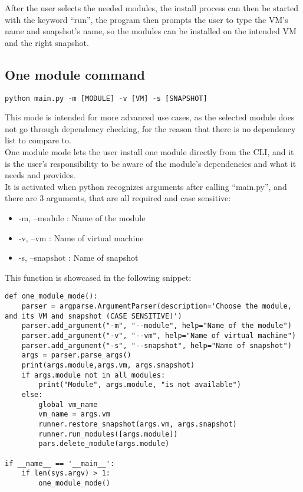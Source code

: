 After the user selects the needed modules, the install process can then be started with the keyword “run”, the program then prompts the user to type the VM’s name and snapshot’s name, so the modules can be installed on the intended VM and the right snapshot.\\

\subsection{One module command}
\begin{lstlisting}[caption=One module mode, style=pythonstyle]
python main.py -m [MODULE] -v [VM] -s [SNAPSHOT]
\end{lstlisting}

This mode is intended for more advanced use cases, as the selected module does not go through dependency checking, for the reason that there is no dependency list to compare to.\\
One module mode lets the user install one module directly from the CLI, and it is the user’s responsibility to be aware of the module’s dependencies and what it needs and provides.\\
It is activated when python recognizes arguments after calling “main.py”, and there are 3 arguments, that are all required and case sensitive:
\begin{itemize}
  \item -m, --module : Name of the module
  \item -v, --vm : Name of virtual machine
  \item -s, --snapshot : Name of snapshot
\end{itemize}

This function is showcased in the following snippet:

\begin{lstlisting}[caption=One module function, style=pythonstyle]
def one_module_mode():
    parser = argparse.ArgumentParser(description='Choose the module, and its VM and snapshot (CASE SENSITIVE)')
    parser.add_argument("-m", "--module", help="Name of the module")
    parser.add_argument("-v", "--vm", help="Name of virtual machine")
    parser.add_argument("-s", "--snapshot", help="Name of snapshot")
    args = parser.parse_args()
    print(args.module,args.vm, args.snapshot)
    if args.module not in all_modules:
        print("Module", args.module, "is not available")
    else:
        global vm_name
        vm_name = args.vm
        runner.restore_snapshot(args.vm, args.snapshot)
        runner.run_modules([args.module])
        pars.delete_module(args.module)

if __name__ == '__main__':
    if len(sys.argv) > 1:
        one_module_mode()
\end{lstlisting}

